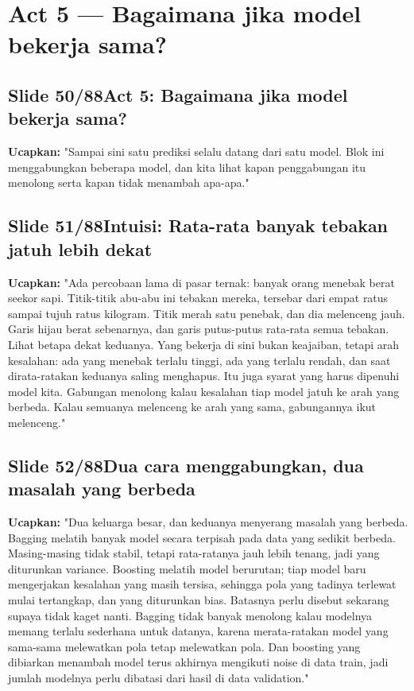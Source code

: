 \documentclass[11pt]{article}
\renewcommand{\framebox}[1]{\colorbox{acc!15}{\textcolor{acc}{\textbf{#1}}}}
\begin{document}
\section{Act 5 — Bagaimana jika model bekerja sama?}

\subsection*{\framebox{Slide 50/88}\quad Act 5: Bagaimana jika model bekerja sama?}
\textbf{Ucapkan:} "Sampai sini satu prediksi selalu datang dari satu model. Blok ini menggabungkan beberapa model, dan kita lihat kapan penggabungan itu menolong serta kapan tidak menambah apa-apa."\\[2pt]

\subsection*{\framebox{Slide 51/88}\quad Intuisi: Rata-rata banyak tebakan jatuh lebih dekat}
\textbf{Ucapkan:} "Ada percobaan lama di pasar ternak: banyak orang menebak berat seekor sapi. Titik-titik abu-abu ini tebakan mereka, tersebar dari empat ratus sampai tujuh ratus kilogram. Titik merah satu penebak, dan dia melenceng jauh. Garis hijau berat sebenarnya, dan garis putus-putus rata-rata semua tebakan. Lihat betapa dekat keduanya. Yang bekerja di sini bukan keajaiban, tetapi arah kesalahan: ada yang menebak terlalu tinggi, ada yang terlalu rendah, dan saat dirata-ratakan keduanya saling menghapus. Itu juga syarat yang harus dipenuhi model kita. Gabungan menolong kalau kesalahan tiap model jatuh ke arah yang berbeda. Kalau semuanya melenceng ke arah yang sama, gabungannya ikut melenceng."\\[2pt]

\subsection*{\framebox{Slide 52/88}\quad Dua cara menggabungkan, dua masalah yang berbeda}
\textbf{Ucapkan:} "Dua keluarga besar, dan keduanya menyerang masalah yang berbeda. Bagging melatih banyak model secara terpisah pada data yang sedikit berbeda. Masing-masing tidak stabil, tetapi rata-ratanya jauh lebih tenang, jadi yang diturunkan variance. Boosting melatih model berurutan; tiap model baru mengerjakan kesalahan yang masih tersisa, sehingga pola yang tadinya terlewat mulai tertangkap, dan yang diturunkan bias. Batasnya perlu disebut sekarang supaya tidak kaget nanti. Bagging tidak banyak menolong kalau modelnya memang terlalu sederhana untuk datanya, karena merata-ratakan model yang sama-sama melewatkan pola tetap melewatkan pola. Dan boosting yang dibiarkan menambah model terus akhirnya mengikuti noise di data train, jadi jumlah modelnya perlu dibatasi dari hasil di data validation."\\[2pt]
\end{document}
